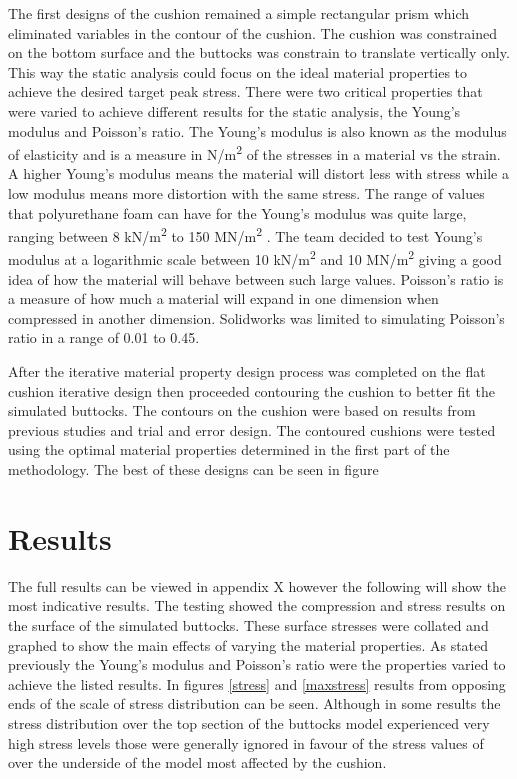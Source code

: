 \documentclass[conference]{IEEEtran}
\begin{document}
The first designs of the cushion remained a simple rectangular prism which eliminated variables in the contour of the cushion. The cushion was constrained on the bottom surface and the buttocks was constrain to translate vertically only. This way the static analysis could focus on the ideal material properties to achieve the desired target peak stress. There were two critical properties that were varied to achieve different results for the static analysis, the Young's modulus and Poisson's ratio. The Young's modulus is also known as the modulus of elasticity and is a measure in N/m\textsuperscript{2} of the stresses in a material vs the strain. A higher Young's modulus means the material will distort less with stress while a low modulus means more distortion with the same stress. The range of values that polyurethane foam can have for the Young's modulus was quite large, ranging between 8 kN/m\textsuperscript{2} to 150 MN/m\textsuperscript{2} \cite{Patel2008}. The team decided to test Young's modulus at a logarithmic scale between 10 kN/m\textsuperscript{2} and 10 MN/m\textsuperscript{2} giving a good idea of how the material will behave between such large values. Poisson's ratio is a measure of how much a material will expand in one dimension when compressed in another dimension. Solidworks was limited to simulating Poisson's ratio in a range of 0.01 to 0.45. 



After the iterative material property design process was completed on the flat cushion iterative design then proceeded contouring the cushion to better fit the simulated buttocks. The contours on the cushion were based on results from previous studies and trial and error design. The contoured cushions were tested using the optimal material properties determined in the first part of the methodology. The best of these designs can be seen in figure


\section{Results}

The full results can be viewed in appendix X however the following will show the most indicative results. The testing showed the compression and stress results on the surface of the simulated buttocks. These surface stresses were collated and graphed to show the main effects of varying the material properties. As stated previously the Young's modulus and Poisson's ratio were the properties varied to achieve the listed results. In figures \ref{stress} and \ref{maxstress} results from opposing ends of the scale of stress distribution can be seen. Although in some results the stress distribution over the top section of the buttocks model experienced very high stress levels those were generally ignored in favour of the stress values of over the underside of the model most affected by the cushion.
\end{document}
